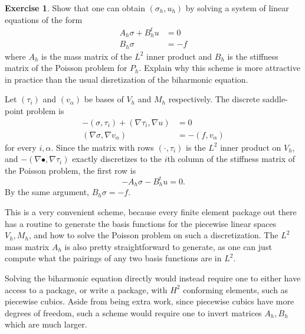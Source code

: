 \documentclass[10pt]{article}
\theoremstyle{definition}
\newtheorem{exer}{Exercise}
\begin{document}
\begin{exer}
Show that one can obtain $(\sigma_h, u_h)$ by solving a system of linear equations of the form 
\begin{align*}
    A_h \sigma + B_h^t u &= 0 \\
    B_h \sigma &= -f
\end{align*}
where $A_h$ is the mass matrix of the $L^2$ inner product and $B_h$ is the stiffness matrix of the Poisson problem for $P_h$.
Explain why this scheme is more attractive in practice than the usual disretization of the biharmonic equation.
\end{exer}

Let $(\tau_i)$ and $(v_\alpha)$ be bases of $V_h$ and $M_h$ respectively. The discrete saddle-point problem is 
\begin{align*}
-(\sigma, \tau_i) + (\nabla \tau_i, \nabla u) &= 0 \\
(\nabla \sigma, \nabla v_\alpha) &= -(f, v_\alpha)
\end{align*}
for every $i, \alpha$.
Since the matrix with rows $(\cdot, \tau_i)$ is the $L^2$ inner product on $V_h$, and $-(\nabla \bullet, \nabla \tau_i)$ exactly discretizes to the $i$th column of the stiffness matrix of the Poisson problem, the first row is
$$-A_h \sigma - B_h^t u = 0.$$
By the same argument, $B_h \sigma = -f$.

This is a very convenient scheme, because every finite element package out there has a routine to generate the basis functions for the piecewise linear spaces $V_h, M_h$, and how to solve the Poisson problem on such a discretization.
The $L^2$ mass matrix $A_h$ is also pretty straightforward to generate, as one can just compute what the pairings of any two basis functions are in $L^2$.

Solving the biharmonic equation directly would instead require one to either have access to a package, or write a package, with $H^2$ conforming elements, such as piecewise cubics. Aside from being extra work, since piecewise cubics have more degrees of freedom, such a scheme would require one to invert matrices $A_h, B_h$ which are much larger.
\end{document}
